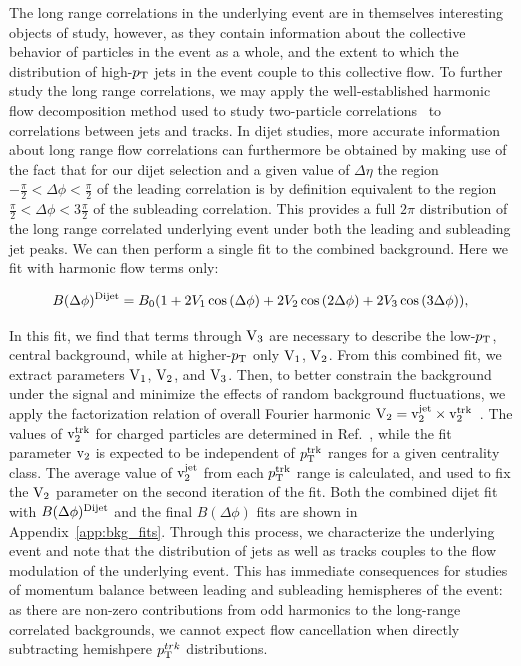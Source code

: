 The long range correlations in the underlying event are in themselves interesting objects of study, however, as they contain information about the collective behavior of particles in the event as a whole, and the extent to which the distribution of high-$p_{\rm T}$ jets in the event couple to this collective flow.  To further study the long range correlations, we may apply the well-established harmonic flow decomposition method used to study two-particle correlations~\cite{Chatrchyan:2012wg} to correlations between jets and tracks.  In dijet studies, more accurate information about long range flow correlations can furthermore be obtained by making use of the fact that for our dijet selection and a given value of $\Delta\eta$ the region $-\frac{\pi}{2}<\Delta\phi<\frac{\pi}{2}$ of the leading correlation is by definition equivalent to the region $\frac{\pi}{2}<\Delta\phi<3\frac{\pi}{2}$ of the subleading correlation.  This provides a full $2\pi$ distribution of the long range correlated underlying event under both the leading and subleading jet peaks.  We can then perform a single fit to the combined background.  Here we fit with harmonic flow terms only:  

\begin{equation}
\label{eq:bkg_fit_dijet}
B(\Delta\phi)^{\rm Dijet} = B_{0}(1+2V_{\rm1}\cos{(\Delta\phi)}+2V_{\rm 2}\cos{(2\Delta\phi)}+2V_{\rm 3}\cos{(3\Delta\phi)}),
\end{equation}

\noindent In this fit, we find that terms through $\rm V_{3}$ are necessary to describe the low-$p_{\rm T}$, central background, while at higher-$p_{\rm T}$ only $\rm V_{1}$, $\rm V_ {2}$.  From this combined fit, we extract parameters $\rm V_{1}$, $\rm V_ {2}$, and $\rm V_{3}$.  Then, to better constrain the background under the signal and minimize the effects of random background fluctuations, we apply the factorization relation of overall Fourier harmonic $\rm V_{2} = v_{2}^{jet} \times v_{2}^{trk}$~\cite{Aamodt:2011by, Chatrchyan:2011eka}. The values of $\rm v_{2}^{trk}$ for charged particles are determined in Ref.~\cite{Chatrchyan:2012wg}, while the fit parameter $\rm v_{2}$ is expected to be independent of  $p_{\rm T}^{\rm trk}$ ranges for a given centrality class.  The average value of $\rm v_{2}^{jet}$ from each $p_{\rm T}^{\rm trk}$ range is calculated, and used to fix the $\rm V_{2}$ parameter on the second iteration of the fit.  Both the combined dijet fit with $B(\Delta\phi)^{\rm Dijet}$ and the final $B(\Delta\phi)$ fits are shown in Appendix~\ref{app:bkg_fits}.  Through this process, we characterize the underlying event and note that the distribution of jets as well as tracks couples to the flow modulation of the underlying event.  This has immediate consequences for studies of momentum balance between leading and subleading hemispheres of the event:  as there are non-zero contributions from odd harmonics to the long-range correlated backgrounds, we cannot expect flow cancellation when directly subtracting hemishpere $p_{\rm T}^{trk}$ distributions.  

